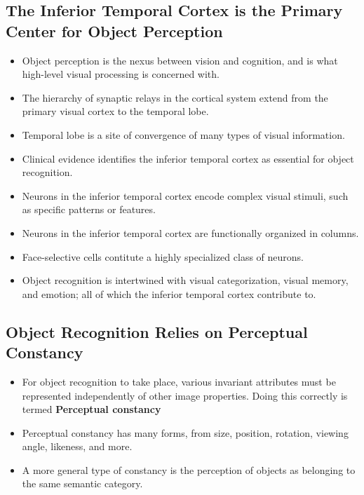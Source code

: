 \documentclass[12pt,a4paper]{article}
\begin{document}
\subsection{The Inferior Temporal Cortex is the Primary Center for Object Perception}
\begin{itemize}
    \item Object perception is the nexus between vision and cognition, and is what high-level visual processing is concerned with.
    \item The hierarchy of synaptic relays in the cortical system extend from the primary visual cortex to the temporal lobe.
    \item Temporal lobe is a site of convergence of many types of visual information.
    \item Clinical evidence identifies the inferior temporal cortex as essential for object recognition.
    \item Neurons in the inferior temporal cortex encode complex visual stimuli, such as specific patterns or features.
    \item Neurons in the inferior temporal cortex are functionally organized in columns.
    \item Face-selective cells contitute a highly specialized class of neurons.
    \item Object recognition is intertwined with visual categorization, visual memory, and emotion; all of which the inferior temporal cortex contribute to.
\end{itemize}

\subsection{Object Recognition Relies on Perceptual Constancy}
\begin{itemize}
    \item For object recognition to take place, various invariant attributes must be represented independently of other image properties. Doing this correctly is termed \textbf{Perceptual constancy}
    \item Perceptual constancy has many forms, from size, position, rotation, viewing angle, likeness, and more.
    \item A more general type of constancy is the perception of objects as belonging to the same semantic category.
\end{itemize}
\end{document}
